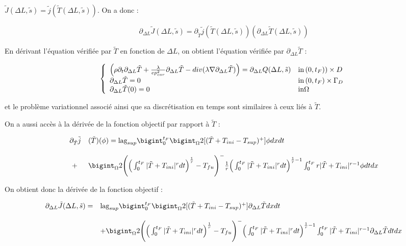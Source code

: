 \documentclass[11pt,a4paper]{article}
\begin{document}
$\tilde{J}(\Delta L,\tilde{s})=\tilde{j}(\tilde{T}(\Delta L,\tilde{s}))$. On a donc :

\begin{equation}
\partial_{\Delta L}\tilde{J}(\Delta L,\tilde{s})=\partial_{\tilde{T}}\tilde{j}(\tilde{T}(\Delta L,\tilde{s}))(\partial_{\Delta L}\tilde{T}(\Delta L,\tilde{s}))
\end{equation}

En dérivant l'équation vérifiée par $\tilde{T}$ en fonction de $\Delta L$, on obtient l'équation vérifiée par $\partial_{\Delta L}\tilde{T}$ :

\begin{equation}
\label{eq:ChaleurDerTilde}
\left\{\begin{array}{ll}
	\Big(\rho\partial_t \partial_{\Delta L}\tilde{T}+\frac{\lambda}{ep_{car}^2} \partial_{\Delta L}\tilde{T}-div(\lambda\nabla \partial_{\Delta L}\tilde{T})\Big)=\partial_{\Delta L}Q(\Delta L,\tilde{s})& \textrm{in\,}(0,t_F))\times D \\
	\partial_{\Delta L}\tilde{T}=0 & \textrm{in\,}(0,t_F)\times \Gamma_D \\
	\partial_{\Delta L}\tilde{T}(0)=0 & \textrm{in} \Omega
\end{array}\right.
\end{equation}

et le problème variationnel associé ainsi que sa discrétisation en temps sont similaires à ceux liés à $\tilde{T}$.

On a aussi accès à la dérivée de la fonction objectif par rapport à $\tilde{T}$ :

\begin{equation}
\begin{array}{ll}
\partial_{\tilde{T}}\tilde{j}&(\tilde{T})(\phi)= \textrm{lag}_{sup} \bigint_{0}^{t_F}\bigint_{\Omega}2[(\tilde{T}+T_{ini}-T_{sup})^+]\phi dxdt\\
\\
\,\, +&\bigint_{\Omega}2\Bigg(\Big(\int_{0}^{t_F}|\tilde{T}+T_{ini}|^rdt\Big)^{\frac{1}{r}}-T_{fu}\Bigg)^-\frac{1}{r}\Big(\int_{0}^{t_F}|\tilde{T}+T_{ini}|^rdt\Big)^{\frac{1}{r}-1}\int_{0}^{t_F}r|\tilde{T}+T_{ini}|^{r-1}\phi dtdx \\
\end{array}
\end{equation}

On obtient donc la dérivée de la fonction objectif :

\begin{equation}
\begin{array}{ll}
\partial_{\Delta L}\tilde{J}(\Delta L,\tilde{s})= & \textrm{lag}_{sup} \bigint_{0}^{t_F}\bigint_{\Omega}2[(\tilde{T}+T_{ini}-T_{sup})^+]\partial_{\Delta L}\tilde{T} dxdt\\
\\
 \,&+\bigint_{\Omega}2\Bigg(\Big(\int_{0}^{t_F}|\tilde{T}+T_{ini}|^rdt\Big)^{\frac{1}{r}}-T_{fu}\Bigg)^-\Big(\int_{0}^{t_F}|\tilde{T}+T_{ini}|^rdt\Big)^{\frac{1}{r}-1}\int_{0}^{t_F}|\tilde{T}+T_{ini}|^{r-1}\partial_{\Delta L}\tilde{T} dtdx \\
\end{array}
\end{equation}
\end{document}
